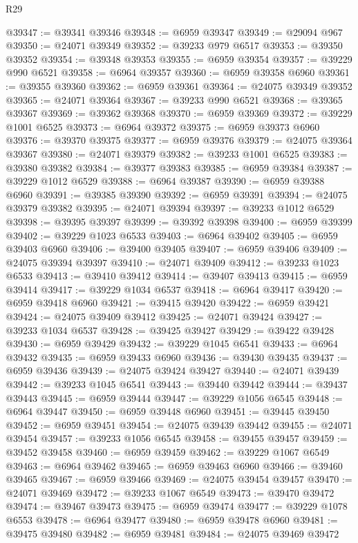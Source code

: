 \begin{lexlean}{R29}
\begin{coremodule}
@39347 := @39341 @39346
@39348 := @6959 @39347
@39349 := @29094 @967
@39350 := @24071 @39349
@39352 := @39233 @979 @6517
@39353 := @39350 @39352
@39354 := @39348 @39353
@39355 := @6959 @39354
@39357 := @39229 @990 @6521
@39358 := @6964 @39357
@39360 := @6959 @39358 @6960
@39361 := @39355 @39360
@39362 := @6959 @39361
@39364 := @24075 @39349 @39352
@39365 := @24071 @39364
@39367 := @39233 @990 @6521
@39368 := @39365 @39367
@39369 := @39362 @39368
@39370 := @6959 @39369
@39372 := @39229 @1001 @6525
@39373 := @6964 @39372
@39375 := @6959 @39373 @6960
@39376 := @39370 @39375
@39377 := @6959 @39376
@39379 := @24075 @39364 @39367
@39380 := @24071 @39379
@39382 := @39233 @1001 @6525
@39383 := @39380 @39382
@39384 := @39377 @39383
@39385 := @6959 @39384
@39387 := @39229 @1012 @6529
@39388 := @6964 @39387
@39390 := @6959 @39388 @6960
@39391 := @39385 @39390
@39392 := @6959 @39391
@39394 := @24075 @39379 @39382
@39395 := @24071 @39394
@39397 := @39233 @1012 @6529
@39398 := @39395 @39397
@39399 := @39392 @39398
@39400 := @6959 @39399
@39402 := @39229 @1023 @6533
@39403 := @6964 @39402
@39405 := @6959 @39403 @6960
@39406 := @39400 @39405
@39407 := @6959 @39406
@39409 := @24075 @39394 @39397
@39410 := @24071 @39409
@39412 := @39233 @1023 @6533
@39413 := @39410 @39412
@39414 := @39407 @39413
@39415 := @6959 @39414
@39417 := @39229 @1034 @6537
@39418 := @6964 @39417
@39420 := @6959 @39418 @6960
@39421 := @39415 @39420
@39422 := @6959 @39421
@39424 := @24075 @39409 @39412
@39425 := @24071 @39424
@39427 := @39233 @1034 @6537
@39428 := @39425 @39427
@39429 := @39422 @39428
@39430 := @6959 @39429
@39432 := @39229 @1045 @6541
@39433 := @6964 @39432
@39435 := @6959 @39433 @6960
@39436 := @39430 @39435
@39437 := @6959 @39436
@39439 := @24075 @39424 @39427
@39440 := @24071 @39439
@39442 := @39233 @1045 @6541
@39443 := @39440 @39442
@39444 := @39437 @39443
@39445 := @6959 @39444
@39447 := @39229 @1056 @6545
@39448 := @6964 @39447
@39450 := @6959 @39448 @6960
@39451 := @39445 @39450
@39452 := @6959 @39451
@39454 := @24075 @39439 @39442
@39455 := @24071 @39454
@39457 := @39233 @1056 @6545
@39458 := @39455 @39457
@39459 := @39452 @39458
@39460 := @6959 @39459
@39462 := @39229 @1067 @6549
@39463 := @6964 @39462
@39465 := @6959 @39463 @6960
@39466 := @39460 @39465
@39467 := @6959 @39466
@39469 := @24075 @39454 @39457
@39470 := @24071 @39469
@39472 := @39233 @1067 @6549
@39473 := @39470 @39472
@39474 := @39467 @39473
@39475 := @6959 @39474
@39477 := @39229 @1078 @6553
@39478 := @6964 @39477
@39480 := @6959 @39478 @6960
@39481 := @39475 @39480
@39482 := @6959 @39481
@39484 := @24075 @39469 @39472

\end{coremodule}
\end{lexlean}
